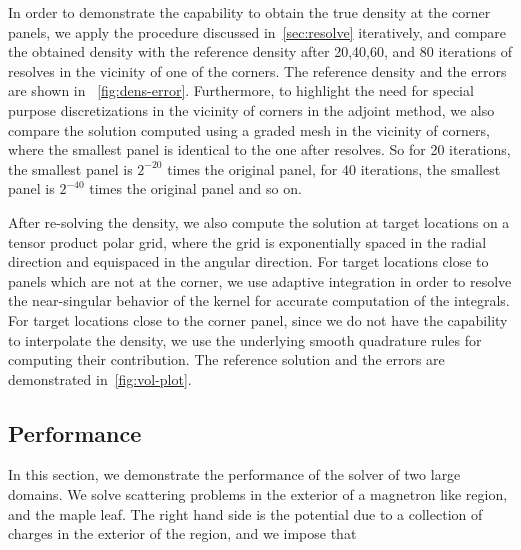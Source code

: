 In order to demonstrate the capability to obtain the true density at the corner panels, we  apply the procedure
discussed in~\cref{sec:resolve} iteratively, and compare the obtained density with the reference density after 20,40,60, and
80 iterations of resolves in the vicinity of one of the corners. The reference density and the errors are shown in ~\cref{fig:dens-error}. Furthermore, to highlight the need for special purpose discretizations in the vicinity of corners in the adjoint method, we also compare the solution computed using a graded mesh in the vicinity of corners, where the smallest panel is identical
to the one after resolves. So for 20 iterations, the smallest panel is $2^{-20}$ times the original panel, for $40$ iterations,
the smallest panel is $2^{-40}$ times the original panel and so on.

After re-solving the density, we also compute the solution at target locations on a tensor product polar grid, where the grid
is exponentially spaced in the radial direction and equispaced in the angular direction. For target locations
close to panels which are not at the corner, we use adaptive integration in order to resolve the near-singular behavior of
the kernel for accurate computation of the integrals. For target locations close to the corner panel, since we do not have
the capability to interpolate the density, we use the underlying smooth quadrature rules for computing their contribution. 
The reference solution and the errors are demonstrated in~\cref{fig:vol-plot}.
\subsection{Performance}
In this section, we demonstrate the performance of the solver of two large domains. We solve scattering problems in the
exterior of a magnetron like region, and the maple leaf. The right hand side is the potential due to a collection of charges in the exterior of the region, and we impose that 
